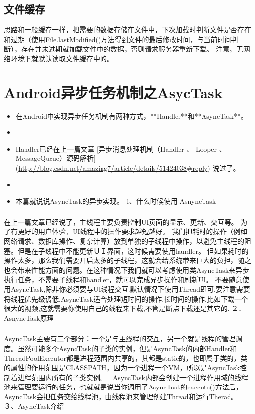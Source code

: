 \documentclass[9pt, b5paper]{article}
\begin{document}
\subsection{文件缓存}
\label{sec-8-4}
思路和一般缓存一样，把需要的数据存储在文件中，下次加载时判断文件是否存在和过期（使用File.lastModified()方法得到文件的最后修改时间，与当前时间判断），存在并未过期就加载文件中的数据，否则请求服务器重新下载。
注意，无网络环境下就默认读取文件缓存中的。
\section{Android异步任务机制之AsycTask}
\label{sec-9}
\begin{itemize}
\item 在Android中实现异步任务机制有两种方式，**Handler**和**AsyncTask**。
\item 
\item Handler已经在上一篇文章 [异步消息处理机制（Handler 、 Looper 、MessageQueue）源码解析](\url{http://blog.csdn.net/amazing7/article/details/51424038#reply}) 说过了。
\item 
\item 本篇就说说AsyncTask的异步实现。
1、什么时候使用 AsnyncTask
\end{itemize}
\subsubsection{}
\label{sec-9-0-1}
在上一篇文章已经说了，主线程主要负责控制UI页面的显示、更新、交互等。  为了有更好的用户体验，UI线程中的操作要求越短越好。
我们把耗时的操作（例如网络请求、数据库操作、复杂计算）放到单独的子线程中操作，以避免主线程的阻塞。但是在子线程中不能更新ＵＩ界面，这时候需要使用handler。
但如果耗时的操作太多，那么我们需要开启太多的子线程，这就会给系统带来巨大的负担，随之也会带来性能方面的问题。在这种情况下我们就可以考虑使用类AsyncTask来异步执行任务，不需要子线程和handler，就可以完成异步操作和刷新UI。
不要随意使用AsyncTask,除非你必须要与UI线程交互.默认情况下使用Thread即可,要注意需要将线程优先级调低.AsyncTask适合处理短时间的操作,长时间的操作,比如下载一个很大的视频,这就需要你使用自己的线程来下载,不管是断点下载还是其它的.
 ２、AsnyncTask原理
\subsubsection{}
\label{sec-9-0-2}
AsyncTask主要有二个部分：一个是与主线程的交互，另一个就是线程的管理调度。虽然可能多个AsyncTask的子类的实例，但是AsyncTask的内部Handler和ThreadPoolExecutor都是进程范围内共享的，其都是static的，也即属于类的，类的属性的作用范围是CLASSPATH，因为一个进程一个VM，所以是AsyncTask控制着进程范围内所有的子类实例。　
AsyncTask内部会创建一个进程作用域的线程池来管理要运行的任务，也就就是说当你调用了AsyncTask的execute()方法后，AsyncTask会把任务交给线程池，由线程池来管理创建Thread和运行Therad。
 ３、AsyncTask介绍
\end{document}
